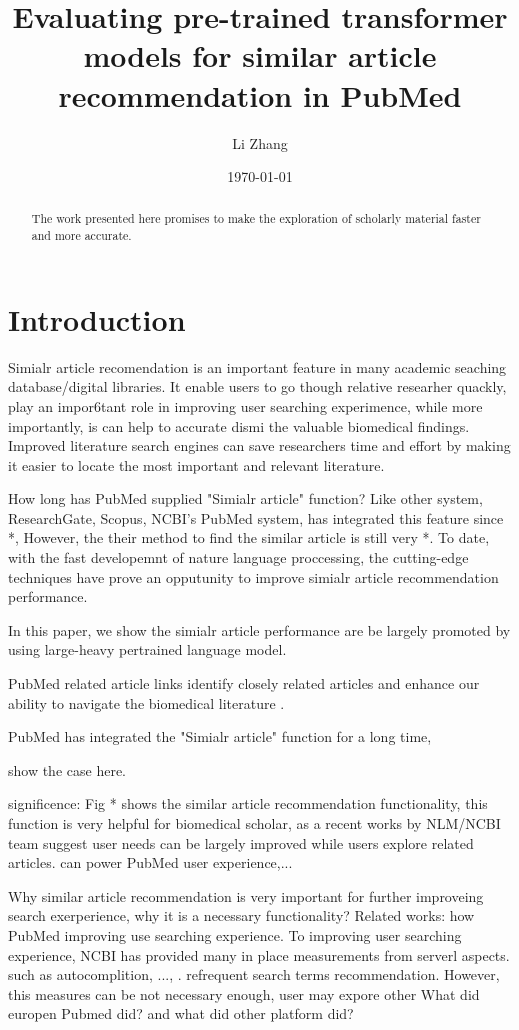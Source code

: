 \documentclass[11pt]{article}
\title{Evaluating pre-trained transformer models for similar article recommendation in PubMed}
\author{Li Zhang}
\date{\today}
\begin{document}
    \maketitle

    \begin{abstract}
        The work presented here promises to make the exploration of scholarly material faster and more accurate.
    \end{abstract}

    \newpage


    \section{Introduction}
    Simialr article recomendation is an important feature in many academic seaching database/digital libraries. It enable users to go though relative researher quackly, play an impor6tant role in improving user searching experimence, while more importantly, is can help to accurate dismi the valuable biomedical findings.
    Improved literature search engines can save researchers time and effort by making it easier to locate the most important and relevant literature. \cite{2006Text}

    How long has PubMed supplied "Simialr article" function?
    Like other system, ResearchGate, Scopus, NCBI's PubMed system, has integrated this feature since *, However, the their method to find the similar article is still very *. To date, with the fast developemnt of
    nature language proccessing, the cutting-edge techniques have prove an opputunity to improve simialr article recommendation performance.


    In this paper, we show the simialr article performance are be largely promoted by using large-heavy pertrained language model.

    PubMed related article links identify closely related articles and enhance our ability to navigate the biomedical literature \cite{Enriching2009}.

    PubMed has integrated the "Simialr article" function for a long time,

    show the case here.

    significence:
    Fig * shows the similar article recommendation functionality, this function is very helpful for biomedical scholar, as a recent works by NLM/NCBI team suggest user needs can be largely improved while users explore related articles.
    can power PubMed user experience,...

    Why similar article recommendation is very important for further improveing search exerperience, why it is a necessary functionality?
    Related works: how PubMed improving use searching experience. To improving user searching experience, NCBI has provided many in place measurements from serverl aspects.
    such as autocomplition, ..., . refrequent search terms recommendation. However, this measures can be not necessary enough, user may expore other
    What did europen Pubmed did? and what did other platform did?
\end{document}
